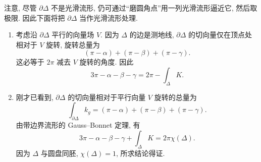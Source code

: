 \begin{description}[font=\normalfont,leftmargin=2em,labelwidth=1.5em]
注意, 尽管 $\partial\Delta$ 不是光滑流形, 仍可通过\textquotedblleft 磨圆角点\textquotedblright 用一列光滑流形逼近它, 然后取极限. 因此下面将把 $\partial\Delta$ 当作光滑流形处理.
\begin{enumerate}[label=(\alph*),ref=\alph*,leftmargin=*]
\item 考虑沿 $\partial\Delta$ 平行的向量场 $V$. 因为 $\Delta$ 的边是测地线, $\partial\Delta$ 的切向量仅在顶点处相对于 $V$ 旋转, 旋转总量为
\[
  (\pi-\alpha)+(\pi-\beta)+(\pi-\gamma).
\]
这必等于 $2\pi$ 减去 $V$ 旋转的角度. 因此
\[
  3\pi-\alpha-\beta-\gamma=2\pi-\int_\Delta K.
\]
\item 刚才已看到, $\partial\Delta$ 的切向量相对于平行向量 $V$ 旋转的总量为
\[
  \int_{\partial\Delta} k_g=(\pi-\alpha)+(\pi-\beta)+(\pi-\gamma).
\]
由带边界流形的 Gauss–Bonnet 定理, 有
\[
  3\pi-\alpha-\beta-\gamma+\int_\Delta K=2\pi\chi(\Delta).
\]
因为 $\Delta$ 与圆盘同胚, $\chi(\Delta)=1$, 所求结论得证.
\end{enumerate}
\end{description}
